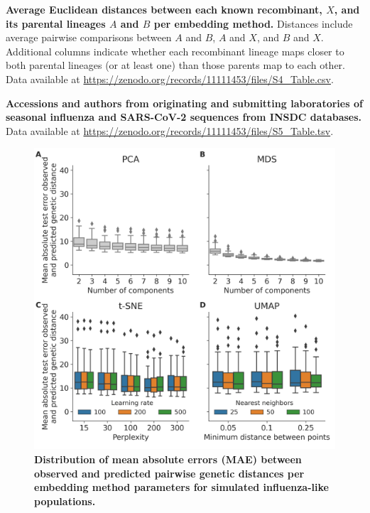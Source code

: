 \begin{table}
\caption{{\bf Average Euclidean distances between each known recombinant, $X$, and its parental lineages $A$ and $B$ per embedding method.}
Distances include average pairwise comparisons between $A$ and $B$, $A$ and $X$, and $B$ and $X$.
Additional columns indicate whether each recombinant lineage maps closer to both parental lineages (or at least one) than those parents map to each other.
Data available at \href{https://zenodo.org/records/11111453/files/S4_Table.csv}{https://zenodo.org/records/11111453/files/S4\_Table.csv}.}\label{S_Table_recombinant_distances}
\end{table}

\begin{table}
\caption{{\bf Accessions and authors from originating and submitting laboratories of seasonal influenza and SARS-CoV-2 sequences from INSDC databases.}
Data available at \href{https://zenodo.org/records/11111453/files/S5_Table.tsv}{https://zenodo.org/records/11111453/files/S5\_Table.tsv}.}\label{S_Table_accessions}
\end{table}

\begin{figure}[!h]
  \includegraphics[width=0.9\columnwidth]{figures/simulated-influenza-like-with-no-reassortment-scores-by-parameters.png}
  \caption{{\bf Distribution of mean absolute errors (MAE) between observed and predicted pairwise genetic distances per embedding method parameters for simulated influenza-like populations.}}\label{S_Fig_simulated_flu_errors}
\end{figure}

